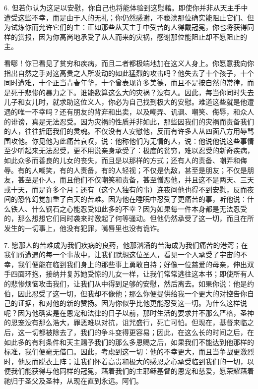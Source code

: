 6. 但若你认为这足以安慰，你自己也将能体验到这慰藉。即使你并非从天主手中遭受这些不幸，而是由于人的无礼；你仍然感谢，不亵渎那位确实能阻止它们、但为试炼你而允许它们的主：正如那些从天主手中受苦的人得戴冠冕，你也将获得同样的赏报，因为你高尚地承受了从人而来的灾祸，感谢那位能阻止却不愿阻止的主。\par

看哪！你已看见了贫穷和疾病，而且二者都极端地加在这义人身上。你愿意我向你指出自然之手对这高贵之人所发动的如此猛烈的攻击吗？他失去了十个孩子，十个同时遭难，十个正当青春年华，十个曾表现许多美德，而且不是按自然的常律，而是死于悲惨的暴力之下。谁能数算这么大的灾祸？没有人。因此，每当你同时失去儿子和女儿时，就求助这位义人，你必为自己找到极大的安慰。难道这些就是他遭遇的唯一不幸吗？还有朋友的背弃和出卖，以及嘲弄、讥讽、嘲笑、侮辱，和众人的诽谤，真是无法忍受。因为灾祸的性质并非如此，那些因我们的灾祸而责备我们的人，往往折磨我们的灵魂。不仅没有人安慰他，反而有许多人从四面八方用辱骂围攻他。你见他为此痛苦哀叹，说：他称他们为无情的人，说：他说他说这些事情至少听起来无法忍受，更不用说亲身承受了：极度的贫穷，难以忍受的新奇疾病，如此众多而善良的儿女的丧失，而且是以那样的方式；还有人的责备、嘲弄和侮辱。有的人嘲笑，有的人责备，有的人轻视；不仅是仇敌，甚至是朋友；不仅是朋友，甚至是仆人，而且他们不仅嘲笑和责备，甚至憎恶他，并且这不是两天、三天或十天，而是许多个月；还有（这个人独有的事）连夜间他也得不到安慰，反而夜间的恐怖幻觉加重了白天的苦难。因为他在睡眠中忍受了更痛苦的事，听他说：什么铁人、什么钢石之心能忍受如此多的不幸？因为如果每一件本身都是无法忍受的，那么想想它们同时袭来时激起了何等骚动。但他仍然承受了这一切，而且在所发生的一切事上，他没有犯罪，嘴唇里也没有诡诈。\par

7. 愿那人的苦难成为我们疾病的良药，他那汹涌的苦海成为我们痛苦的港湾；在我们所遭遇的每一个事故中，让我们默想这位圣人，看见一个人承受了宇宙的不幸，我们便能在临到我们身上的那些事上勇敢自持；好像一位慈爱的母亲，伸出双手四面环抱，接纳并复苏她受惊的儿女一样，让我们常常逃往这本书；即使所有人的悲惨烦恼攻击我们，让我们从中得到足够的安慰，然后离去。如果你说：他是约伯，因此忍受了这一切，但我却不像他；那么你便提供给我一个更大的对控告你自己的证据，和对他的新的赞扬。因为你似乎比他更能忍受这一切。为什么这样说呢？因为他确实是在恩宠和法律的日子以前，那时生活的要求并不那么严格，圣神的恩宠没有那么浩大，罪恶难以对抗，诅咒盛行，死亡可怕。但现在，基督来临之后，这一切都被除去了，我们的争斗变得更容易；因此，在这么长的时间之后，在如此多的有利条件和天主赐予我们的那么多恩赐之后，如果我们不能达到他那样的标准，我们便毫无借口。因此，考虑到这一切：他的不幸更大，而且当争战更激烈时，他反而脱衣上阵；让我们怀着高贵和极大的感恩之心承受临到我们的一切，以便我们能获得与他同样的冠冕，藉着我们的主耶稣基督的恩宠和慈爱，愿荣耀藉着祂归于圣父及圣神，从现在直到永远。阿们。\par

